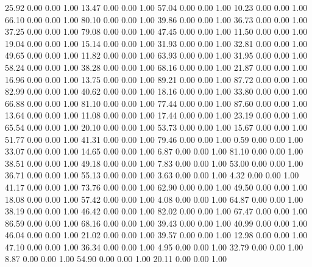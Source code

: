    25.92   0.00   0.00   1.00
   13.47   0.00   0.00   1.00
   57.04   0.00   0.00   1.00
   10.23   0.00   0.00   1.00
   66.10   0.00   0.00   1.00
   80.10   0.00   0.00   1.00
   39.86   0.00   0.00   1.00
   36.73   0.00   0.00   1.00
   37.25   0.00   0.00   1.00
   79.08   0.00   0.00   1.00
   47.45   0.00   0.00   1.00
   11.50   0.00   0.00   1.00
   19.04   0.00   0.00   1.00
   15.14   0.00   0.00   1.00
   31.93   0.00   0.00   1.00
   32.81   0.00   0.00   1.00
   49.65   0.00   0.00   1.00
   11.82   0.00   0.00   1.00
   63.93   0.00   0.00   1.00
   31.95   0.00   0.00   1.00
   58.24   0.00   0.00   1.00
   38.28   0.00   0.00   1.00
   68.16   0.00   0.00   1.00
   21.87   0.00   0.00   1.00
   16.96   0.00   0.00   1.00
   13.75   0.00   0.00   1.00
   89.21   0.00   0.00   1.00
   87.72   0.00   0.00   1.00
   82.99   0.00   0.00   1.00
   40.62   0.00   0.00   1.00
   18.16   0.00   0.00   1.00
   33.80   0.00   0.00   1.00
   66.88   0.00   0.00   1.00
   81.10   0.00   0.00   1.00
   77.44   0.00   0.00   1.00
   87.60   0.00   0.00   1.00
   13.64   0.00   0.00   1.00
   11.08   0.00   0.00   1.00
   17.44   0.00   0.00   1.00
   23.19   0.00   0.00   1.00
   65.54   0.00   0.00   1.00
   20.10   0.00   0.00   1.00
   53.73   0.00   0.00   1.00
   15.67   0.00   0.00   1.00
   51.77   0.00   0.00   1.00
   41.31   0.00   0.00   1.00
   79.46   0.00   0.00   1.00
    0.59   0.00   0.00   1.00
   33.07   0.00   0.00   1.00
   14.65   0.00   0.00   1.00
    6.87   0.00   0.00   1.00
   81.10   0.00   0.00   1.00
   38.51   0.00   0.00   1.00
   49.18   0.00   0.00   1.00
    7.83   0.00   0.00   1.00
   53.00   0.00   0.00   1.00
   36.71   0.00   0.00   1.00
   55.13   0.00   0.00   1.00
    3.63   0.00   0.00   1.00
    4.32   0.00   0.00   1.00
   41.17   0.00   0.00   1.00
   73.76   0.00   0.00   1.00
   62.90   0.00   0.00   1.00
   49.50   0.00   0.00   1.00
   18.08   0.00   0.00   1.00
   57.42   0.00   0.00   1.00
    4.08   0.00   0.00   1.00
   64.87   0.00   0.00   1.00
   38.19   0.00   0.00   1.00
   46.42   0.00   0.00   1.00
   82.02   0.00   0.00   1.00
   67.47   0.00   0.00   1.00
   86.59   0.00   0.00   1.00
   68.16   0.00   0.00   1.00
   39.43   0.00   0.00   1.00
   40.99   0.00   0.00   1.00
   46.04   0.00   0.00   1.00
   21.02   0.00   0.00   1.00
   39.57   0.00   0.00   1.00
   12.98   0.00   0.00   1.00
   47.10   0.00   0.00   1.00
   36.34   0.00   0.00   1.00
    4.95   0.00   0.00   1.00
   32.79   0.00   0.00   1.00
    8.87   0.00   0.00   1.00
   54.90   0.00   0.00   1.00
   20.11   0.00   0.00   1.00
